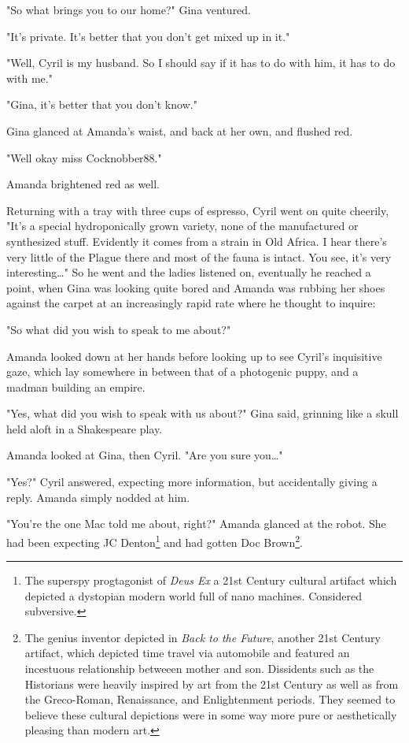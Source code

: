 \documentclass[12pt]{article}
\begin{document}
"So what brings you to our home?" Gina ventured.

"It's private. It's better that you don't get mixed up in it."

"Well, Cyril is my husband. So I should say if it has to do with him, it has to do with me."

"Gina, it's better that you don't know."

Gina glanced at Amanda's waist, and back at her own, and flushed red.

"Well okay miss Cocknobber88."

Amanda brightened red as well.

Returning with a tray with three cups of espresso, Cyril went on quite cheerily, "It's a special hydroponically grown variety, none of the manufactured or synthesized stuff. Evidently it comes from a strain in Old Africa. I hear there's very little of the Plague there and most of the fauna is intact. You see, it's very interesting\ldots{}" So he went and the ladies listened on, eventually he reached a point, when Gina was looking quite bored and Amanda was rubbing her shoes against the carpet at an increasingly rapid rate where he thought to inquire:

"So what did you wish to speak to me about?"

Amanda looked down at her hands before looking up to see Cyril's inquisitive gaze, which lay somewhere in between that of a photogenic puppy, and a madman building an empire.

"Yes, what did you wish to speak with us about?" Gina said, grinning like a skull held aloft in a Shakespeare play.

Amanda looked at Gina, then Cyril. "Are you sure you\ldots{}"

"Yes?" Cyril answered, expecting more information, but accidentally giving a reply. Amanda simply nodded at him.

"You're the one Mac told me about, right?" Amanda glanced at the robot. She had been expecting JC Denton\footnote{The superspy progtagonist of \emph{Deus Ex} a 21st Century cultural artifact which depicted a dystopian modern world full of nano machines. Considered subversive.} and had gotten Doc Brown\footnote{The genius inventor depicted in \emph{Back to the Future}, another 21st Century artifact, which depicted time travel via automobile and featured an incestuous relationship betweeen mother and son. Dissidents such as the Historians were heavily inspired by art from the 21st Century as well as from the Greco-Roman, Renaissance, and Enlightenment periods. They seemed to believe these cultural depictions were in some way more pure or aesthetically pleasing than modern art.}.
\end{document}
